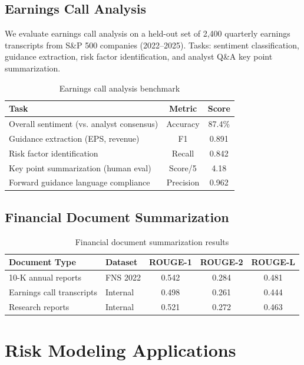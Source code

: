 \documentclass[11pt,a4paper]{article}
\begin{document}
\subsection{Earnings Call Analysis}

We evaluate earnings call analysis on a held-out set of 2,400 quarterly earnings transcripts from S\&P 500 companies (2022--2025). Tasks: sentiment classification, guidance extraction, risk factor identification, and analyst Q\&A key point summarization.

\begin{table}[H]
\centering
\caption{Earnings call analysis benchmark}
\label{tab:earnings}
\begin{tabular}{lcc}
\toprule
Task & Metric & Score \\
\midrule
Overall sentiment (vs. analyst consensus) & Accuracy & 87.4\% \\
Guidance extraction (EPS, revenue) & F1 & 0.891 \\
Risk factor identification & Recall & 0.842 \\
Key point summarization (human eval) & Score/5 & 4.18 \\
Forward guidance language compliance & Precision & 0.962 \\
\bottomrule
\end{tabular}
\end{table}

\subsection{Financial Document Summarization}

\begin{table}[H]
\centering
\caption{Financial document summarization results}
\label{tab:summarization}
\begin{tabular}{llccc}
\toprule
Document Type & Dataset & ROUGE-1 & ROUGE-2 & ROUGE-L \\
\midrule
10-K annual reports & FNS 2022 & 0.542 & 0.284 & 0.481 \\
Earnings call transcripts & Internal & 0.498 & 0.261 & 0.444 \\
Research reports & Internal & 0.521 & 0.272 & 0.463 \\
\bottomrule
\end{tabular}
\end{table}

\section{Risk Modeling Applications}
\end{document}
